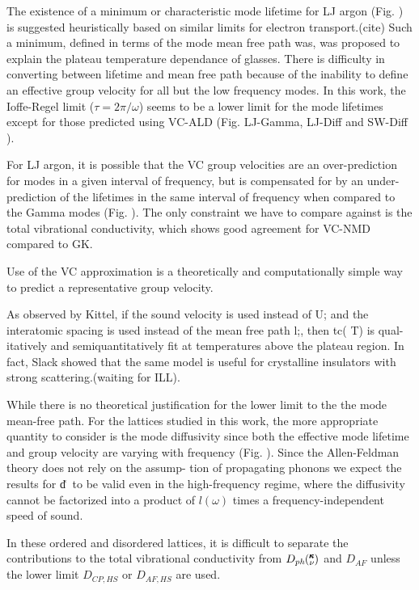 \documentclass[aps,prb,onecolumn,preprint,superscriptaddress,amsmath,amssymb,floatfix]{revtex4}
\newcommand{\kv}{\mspace{-4.0mu}\left(\mspace{-8.0mu}
\begin{smallmatrix}&\pmb{\kappa} \\&\nu\end{smallmatrix}
\mspace{-3.0mu}\right)}
\begin{document}
The existence of a minimum or characteristic mode lifetime for 
LJ argon (Fig. ) is suggested heuristically based on similar limits 
for electron transport.(cite) Such a minimum, defined in terms of the mode 
mean free path was, was proposed to explain the plateau 
temperature dependance of glasses.\cite{graebner_phonon_1986} 
There is difficulty in converting 
between lifetime and mean free path because of the inability to 
define an effective group velocity for all but the low frequency modes. 
In this work, the Ioffe-Regel limit ($\tau = 2\pi/\omega $) seems to be 
a lower limit for the mode lifetimes except for those predicted 
using VC-ALD (Fig. LJ-Gamma, LJ-Diff and SW-Diff ). 

For LJ argon, it is possible that the VC group velocities are an over-prediction 
for modes in a given interval of frequency, 
but is compensated for 
by an under-prediction of the lifetimes in the same interval of 
frequency when compared to the Gamma modes (Fig. ). The only constraint 
we have to compare against is the total vibrational conductivity, which 
shows good agreement for VC-NMD compared to GK. 

Use of the VC approximation is a theoretically and 
computationally simple way to predict a representative group velocity.

As observed by Kittel, if the sound
velocity is used instead of U; and the interatomic spacing
is used instead of the mean free path l;, then tc( T) is qual-
itatively and semiquantitatively
fit at temperatures above
the plateau region.
In fact, Slack showed that the same model 
is useful for crystalline insulators with strong scattering.(waiting for 
ILL).\cite{henry_ehrenreich_thermal_1979}

While there is no theoretical justification for 
the lower limit to the the mode mean-free path.\cite{graebner_phonon_1986} 
For the lattices studied in this work, the more appropriate quantity to 
consider is the mode diffusivity since both the 
effective mode lifetime   
and group velocity are varying with frequency (Fig. ). 
Since the Allen-Feldman theory does not rely on the assump-
tion of propagating phonons we expect the results for d͑␻͒
to be valid even in the high-frequency regime, where the
diffusivity cannot be factorized into a product of $l(\omega)$ times
a frequency-independent speed of sound.

In these ordered and disordered lattices, it is difficult to separate 
the contributions to the total vibrational 
conductivity from $D_{ph}\kv$ and $D_{AF}$ unless the lower limit 
$D_{CP,HS}$ or $D_{AF,HS}$ are used.  
\end{document}

